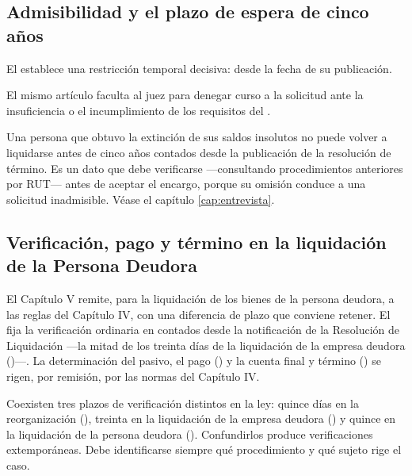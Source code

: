 \subsection{Admisibilidad y el plazo de espera de cinco años}

El  establece una restricción temporal decisiva: 
desde la fecha de su publicación.

El mismo artículo faculta al juez para denegar curso a la solicitud ante la insuficiencia o
el incumplimiento de los requisitos del .

\begin{alerta}
Una persona que obtuvo la extinción de sus saldos insolutos no puede volver a liquidarse
antes de cinco años contados desde la publicación de la resolución de término. Es un dato
que debe verificarse ---consultando procedimientos anteriores por RUT--- antes de aceptar el
encargo, porque su omisión conduce a una solicitud inadmisible. Véase el capítulo
\ref{cap:entrevista}.
\end{alerta}

\subsection{Verificación, pago y término en la liquidación de la Persona Deudora}

El Capítulo V remite, para la liquidación de los bienes de la persona deudora, a las reglas del
Capítulo IV, con una diferencia de plazo que conviene retener. El  fija la verificación
ordinaria en  contados desde la notificación de la Resolución de
Liquidación ---la mitad de los treinta días de la liquidación de la empresa deudora ()---.
La determinación del pasivo, el pago () y la cuenta final y término () se
rigen, por remisión, por las normas del Capítulo IV.

\begin{alerta}
Coexisten tres plazos de verificación distintos en la ley: quince días en la reorganización
(), treinta en la liquidación de la empresa deudora () y quince en la
liquidación de la persona deudora (). Confundirlos produce verificaciones
extemporáneas. Debe identificarse siempre qué procedimiento y qué sujeto rige el caso.
\end{alerta}

